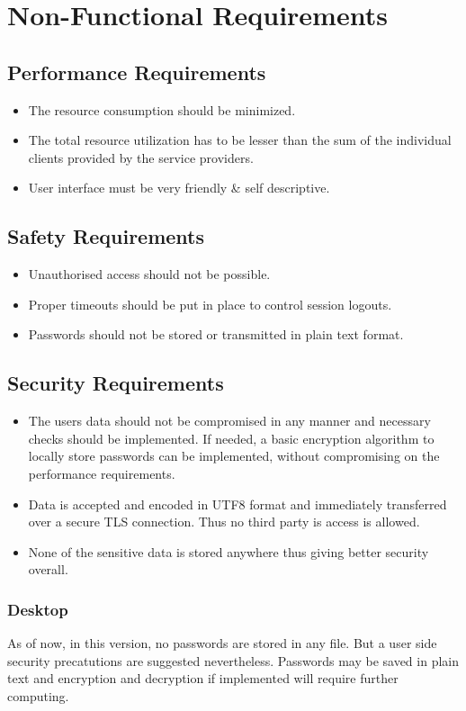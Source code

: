 \documentclass{SureshLimkar}
\begin{document}
\newpage


\section{Non-Functional Requirements}

\subsection{Performance Requirements}
\begin{itemize}
	\item The resource consumption should be minimized.
	\item The total resource utilization has to be lesser than the sum of the individual clients provided by the service providers. 
	\item User interface must be very friendly & self descriptive.
\end{itemize}
\subsection{Safety Requirements}
\begin{itemize}
\item Unauthorised access should not be possible. 
\item Proper timeouts should be put in place to control session logouts.
\item Passwords should not be stored or transmitted in plain text format.
\end{itemize}
\subsection{Security Requirements}
\begin{itemize}
\item The users data should not be compromised in any manner and necessary checks should be implemented. If needed, a basic encryption algorithm to locally store passwords can be implemented, without compromising on the performance requirements.
\item Data is accepted and encoded in UTF8 format and immediately transferred over a secure TLS connection. Thus no third party is access is allowed.
\item None of the sensitive data is stored anywhere thus giving better security overall.
\end{itemize}
\subsubsection{Desktop}
\hspace{0.5 in}As of now, in this version, no passwords are stored in any file. But a user side security precatutions are suggested nevertheless. Passwords may be saved in plain text and encryption and decryption if implemented will require further computing. 
\end{document}
